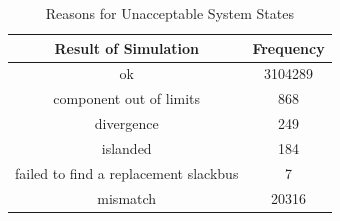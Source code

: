 \documentclass[a4paper,oneside,12pt]{report}
\begin{document}
\begin{table}[htbp]
\caption{Reasons for Unacceptable System States}
\label{table_failure_reasons}
\centering
\begin{tabular}{c||c}
\bfseries Result of Simulation & \bfseries Frequency \\
\hline \hline
ok & 3104289 \\ 
component out of limits & 868 \\ 
divergence & 249 \\ 
islanded & 184 \\ 
failed to find a replacement slackbus & 7 \\ 
mismatch & 20316 \\ 
\hline
\end{tabular} \\
\end{table}
\end{document}
